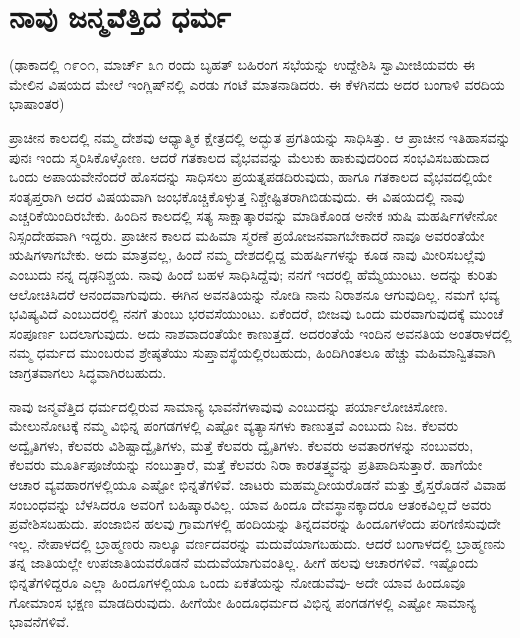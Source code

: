 
\chapter{ನಾವು ಜನ್ಮವೆತ್ತಿದ ಧರ್ಮ}

(ಢಾಕಾದಲ್ಲಿ ೧೯೦೧, ಮಾರ್ಚ್ ೩೧ ರಂದು ಬೃಹತ್​ ಬಹಿರಂಗ ಸಭೆಯನ್ನು ಉದ್ದೇಶಿಸಿ ಸ್ವಾಮೀಜಿಯವರು ಈ ಮೇಲಿನ ವಿಷಯದ ಮೇಲೆ ಇಂಗ್ಲಿಷ್​ನಲ್ಲಿ ಎರಡು ಗಂಟೆ ಮಾತನಾಡಿದರು. ಈ ಕೆಳಗಿನದು ಅದರ ಬಂಗಾಳಿ ವರದಿಯ ಭಾಷಾಂತರ)

ಪ್ರಾಚೀನ ಕಾಲದಲ್ಲಿ ನಮ್ಮ ದೇಶವು ಆಧ್ಯಾತ್ಮಿಕ ಕ್ಷೇತ್ರದಲ್ಲಿ ಅದ್ಭುತ ಪ್ರಗತಿಯನ್ನು ಸಾಧಿಸಿತ್ತು. ಆ ಪ್ರಾಚೀನ ಇತಿಹಾಸವನ್ನು ಪುನಃ ಇಂದು ಸ್ಮರಿಸಿಕೊಳ್ಳೋಣ. ಆದರೆ ಗತಕಾಲದ ವೈಭವವನ್ನು ಮೆಲುಕು ಹಾಕುವುದರಿಂದ ಸಂಭವಿಸಬಹುದಾದ ಒಂದು ಅಪಾಯವೇನೆಂದರೆ ಹೊಸದನ್ನು ಸಾಧಿಸಲು ಪ್ರಯತ್ನಪಡದಿರುವುದು, ಹಾಗೂ ಗತಕಾಲದ ವೈಭವದಲ್ಲಿಯೇ ಸಂತೃಪ್ತರಾಗಿ ಅದರ ವಿಷಯವಾಗಿ ಜಂಭಕೊಚ್ಚಿಕೊಳ್ಳುತ್ತ ನಿಶ್ಚೇಷ್ಟಿತರಾಗಿಬಿಡುವುದು. ಈ ವಿಷಯದಲ್ಲಿ ನಾವು ಎಚ್ಚರಿಕೆಯಿಂದಿರಬೇಕು. ಹಿಂದಿನ ಕಾಲದಲ್ಲಿ ಸತ್ಯ ಸಾಕ್ಷಾತ್ಕಾರವನ್ನು ಮಾಡಿಕೊಂಡ ಅನೇಕ ಋಷಿ ಮಹರ್ಷಿಗಳೇನೋ ನಿಸ್ಸಂದೇಹವಾಗಿ ಇದ್ದರು. ಪ್ರಾಚೀನ ಕಾಲದ ಮಹಿಮಾ ಸ್ಮರಣೆ ಪ್ರಯೋಜನವಾಗಬೇಕಾದರೆ ನಾವೂ ಅವರಂತೆಯೇ ಋಷಿಗಳಾಗಬೇಕು. ಅದು ಮಾತ್ರವಲ್ಲ, ಹಿಂದೆ ನಮ್ಮ ದೇಶದಲ್ಲಿದ್ದ ಮಹರ್ಷಿಗಳನ್ನು ಕೂಡ ನಾವು ಮೀರಿಸಬಲ್ಲೆವು ಎಂಬುದು ನನ್ನ ದೃಢನಿಶ್ಚಯ. ನಾವು ಹಿಂದೆ ಬಹಳ ಸಾಧಿಸಿದ್ದೆವು; ನನಗೆ ಇದರಲ್ಲಿ ಹೆಮ್ಮೆಯುಂಟು. ಅದನ್ನು ಕುರಿತು ಆಲೋಚಿಸಿದರೆ ಆನಂದವಾಗುವುದು. ಈಗಿನ ಅವನತಿಯನ್ನು ನೋಡಿ ನಾನು ನಿರಾಶನೂ ಆಗುವುದಿಲ್ಲ. ನಮಗೆ ಭವ್ಯ ಭವಿಷ್ಯವಿದೆ ಎಂಬುದರಲ್ಲಿ ನನಗೆ ತುಂಬು ಭರವಸೆಯುಂಟು. ಏಕೆಂದರೆ, ಬೀಜವು ಒಂದು ಮರವಾಗುವುದಕ್ಕೆ ಮುಂಚೆ ಸಂಪೂರ್ಣ ಬದಲಾಗುವುದು. ಅದು ನಾಶವಾದಂತೆಯೇ ಕಾಣುತ್ತದೆ. ಅದರಂತೆಯೆ ಇಂದಿನ ಅವನತಿಯ ಅಂತರಾಳದಲ್ಲಿ ನಮ್ಮ ಧರ್ಮದ ಮುಂಬರುವ ಶ್ರೇಷ್ಠತೆಯು ಸುಪ್ತಾವಸ್ಥೆಯಲ್ಲಿರಬಹುದು, ಹಿಂದಿಗಿಂತಲೂ ಹೆಚ್ಚು ಮಹಿಮಾನ್ವಿತವಾಗಿ ಜಾಗ್ರತವಾಗಲು ಸಿದ್ಧವಾಗಿರಬಹುದು.

ನಾವು ಜನ್ಮವೆತ್ತಿದ ಧರ್ಮದಲ್ಲಿರುವ ಸಾಮಾನ್ಯ ಭಾವನೆಗಳಾವುವು ಎಂಬುದನ್ನು ಪರ್ಯಾಲೋಚಿಸೋಣ. ಮೇಲುನೋಟಕ್ಕೆ ನಮ್ಮ ವಿಭಿನ್ನ ಪಂಗಡಗಳಲ್ಲಿ ಎಷ್ಟೋ ವ್ಯತ್ಯಾಸಗಳು ಕಾಣುತ್ತವೆ ಎಂಬುದು ನಿಜ. ಕೆಲವರು ಅದ್ವೈತಿಗಳು, ಕೆಲವರು ವಿಶಿಷ್ಟಾದ್ವೈತಿಗಳು, ಮತ್ತೆ ಕೆಲವರು ದ್ವೈತಿಗಳು. ಕೆಲವರು ಅವತಾರಗಳನ್ನು ನಂಬುವರು, ಕೆಲವರು ಮೂರ್ತಿಪೂಜೆಯನ್ನು ನಂಬುತ್ತಾರೆ, ಮತ್ತೆ ಕೆಲವರು ನಿರಾ ಕಾರತತ್ತ್ವವನ್ನು ಪ್ರತಿಪಾದಿಸುತ್ತಾರೆ. ಹಾಗೆಯೇ ಆಚಾರ ವ್ಯವಹಾರಗಳಲ್ಲಿಯೂ ಎಷ್ಟೋ ಭಿನ್ನತೆಗಳಿವೆ. ಜಾಟರು ಮಹಮ್ಮದೀಯರೊಡನೆ ಮತ್ತು ಕ್ರೈಸ್ತರೊಡನೆ ವಿವಾಹ ಸಂಬಂಧವನ್ನು ಬೆಳಸಿದರೂ ಅವರಿಗೆ ಬಹಿಷ್ಕಾರವಿಲ್ಲ. ಯಾವ ಹಿಂದೂ ದೇವಸ್ಥಾನಕ್ಕಾದರೂ ಆತಂಕವಿಲ್ಲದೆ ಅವರು ಪ್ರವೇಶಿಸಬಹುದು. ಪಂಜಾಬಿನ ಹಲವು ಗ್ರಾಮಗಳಲ್ಲಿ ಹಂದಿಯನ್ನು ತಿನ್ನದವರನ್ನು ಹಿಂದೂಗಳೆಂದು ಪರಿಗಣಿಸುವುದೇ ಇಲ್ಲ. ನೇಪಾಳದಲ್ಲಿ ಬ್ರಾಹ್ಮಣರು ನಾಲ್ಕೂ ವರ್ಣದವರನ್ನು ಮದುವೆಯಾಗಬಹುದು. ಆದರೆ ಬಂಗಾಳದಲ್ಲಿ ಬ್ರಾಹ್ಮಣನು ತನ್ನ ಜಾತಿಯಲ್ಲೇ ಉಪಜಾತಿಯವರೊಡನೆ ಮದುವೆಯಾಗುವಂತಿಲ್ಲ. ಹೀಗೆ ಹಲವು ಆಚಾರಗಳಿವೆ. ಇಷ್ಟೊಂದು ಭಿನ್ನತೆಗಳಿದ್ದರೂ ಎಲ್ಲಾ ಹಿಂದೂಗಳಲ್ಲಿಯೂ ಒಂದು ಏಕತೆಯನ್ನು ನೋಡುವೆವು- ಅದೇ ಯಾವ ಹಿಂದೂವೂ ಗೋಮಾಂಸ ಭಕ್ಷಣ ಮಾಡದಿರುವುದು. ಹೀಗೆಯೇ ಹಿಂದೂಧರ್ಮದ ವಿಭಿನ್ನ ಪಂಗಡಗಳಲ್ಲಿ ಎಷ್ಟೋ ಸಾಮಾನ್ಯ ಭಾವನೆಗಳಿವೆ.


